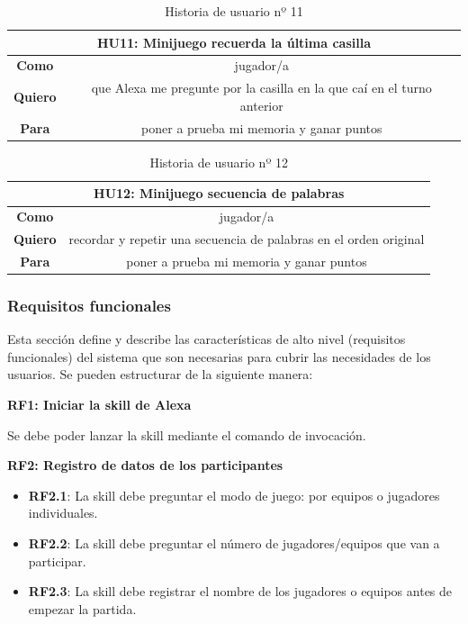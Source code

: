 \begin{table}[H]
	\centering
	\begin{tabular}{|c|c|}
		\hline
		\multicolumn{2}{|c|}{\textbf{HU11}: Minijuego recuerda la última casilla} \\
		\hline
		\textbf{Como} & jugador/a \\
		\hline
		\textbf{Quiero} & que Alexa me pregunte por la casilla en la que caí en el turno anterior \\
		\hline
		\textbf{Para} & poner a prueba mi memoria y ganar puntos \\
		\hline
	\end{tabular}
	\caption{Historia de usuario nº 11}
	\label{tab:HU11}
\end{table}

\begin{table}[H]
	\centering
	\begin{tabular}{|c|c|}
		\hline
		\multicolumn{2}{|c|}{\textbf{HU12}: Minijuego secuencia de palabras} \\
		\hline
		\textbf{Como} & jugador/a \\
		\hline
		\textbf{Quiero} & recordar y repetir una secuencia de palabras en el orden original \\
		\hline
		\textbf{Para} & poner a prueba mi memoria y ganar puntos \\
		\hline
	\end{tabular}
	\caption{Historia de usuario nº 12}
	\label{tab:HU12}
\end{table}

\subsubsection{Requisitos funcionales}

Esta sección define y describe las características de alto nivel (requisitos
funcionales) del sistema que son necesarias para cubrir las necesidades de los
usuarios. Se pueden estructurar de la siguiente manera:
\vspace{0.3cm}

\textbf{RF1: Iniciar la skill de Alexa}

Se debe poder lanzar la skill mediante el comando de invocación.
\vspace{0.5cm}

\textbf{RF2: Registro de datos de los participantes}
\begin{itemize}
	\item \textbf{RF2.1}: La skill debe preguntar el modo de juego: por equipos o jugadores individuales. 
	\item \textbf{RF2.2}: La skill debe preguntar el número de jugadores/equipos que van a participar.
	\item \textbf{RF2.3}: La skill debe registrar el nombre de los jugadores o equipos antes de empezar la partida.
\end{itemize}

